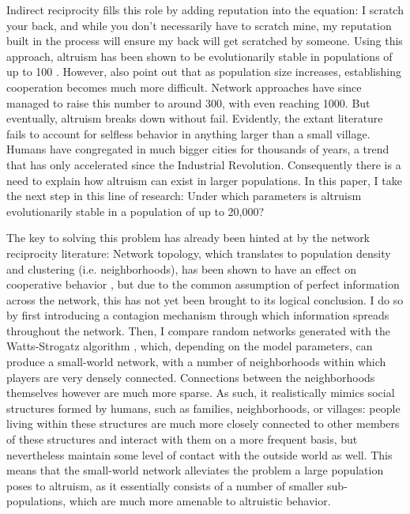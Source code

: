 \documentclass[12pt]{article}
\begin{document}
Indirect reciprocity fills this role by adding reputation into the equation: I scratch your back, and while you don't necessarily have to scratch mine, my reputation built in the process will ensure my back will get scratched by someone. Using this approach, altruism has been shown to be evolutionarily stable in populations of up to 100 \citep{Nowak1998}. However, \cite{Nowak1998} also point out that as population size increases, establishing cooperation becomes much more difficult. Network approaches have since managed to raise this number to around 300, with \cite{Peleteiro2014} even reaching 1000. But eventually, altruism breaks down without fail. Evidently, the extant literature fails to account for selfless behavior in anything larger than a small village. Humans have congregated in much bigger cities for thousands of years, a trend that has only accelerated since the Industrial Revolution. Consequently there is a need to explain how altruism can exist in larger populations. In this paper, I take the next step in this line of research: Under which parameters is altruism evolutionarily stable in a population of up to 20,000?

The key to solving this problem has already been hinted at by the network reciprocity literature: Network topology, which translates to population density and clustering (i.e. neighborhoods), has been shown to have an effect on cooperative behavior \citep{Santos2008,Peleteiro2014}, but due to the common assumption of perfect information across the network, this has not yet been brought to its logical conclusion. I do so by first introducing a contagion mechanism through which information spreads throughout the network. Then, I compare random networks generated with the  Watts-Strogatz algorithm \citep{Watts1998}, which, depending on the model parameters, can produce a small-world network, with a number of neighborhoods within which players are very densely connected. Connections between the neighborhoods themselves however are much more sparse. As such, it realistically mimics social structures formed by humans, such as families, neighborhoods, or villages: people living within these structures are much more closely connected to other members of these structures and interact with them on a more frequent basis, but nevertheless maintain some level of contact with the outside world as well. This means that the small-world network alleviates the problem a large population poses to altruism, as it essentially consists of a number of smaller sub-populations, which are much more amenable to altruistic behavior.
\end{document}
